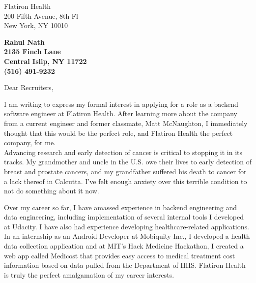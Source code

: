 \documentclass[11pt]{letter} %
\begin{document}

\begin{letter}{Flatiron Health \\
200 Fifth Avenue, 8th Fl \\
New York, NY 10010} 


\begin{center}
\large\bf Rahul Nath \\ %
2135 Finch Lane \\ Central Islip, NY 11722 \\ (516) 491-9232 %
\end{center}

\signature{Rahul Nath} %


\opening{Dear Recruiters,} 
 
I am writing to express my formal interest in applying for a role as a backend software engineer at Flatiron Health. After learning more about the company from a current engineer and former classmate, Matt McNaughton, I immediately thought that this would be the perfect role, and Flatiron Health the perfect company, for me. 
\\

Advancing research and early detection of cancer is critical to stopping it in its tracks. My grandmother and uncle in the U.S. owe their lives to early detection of breast and prostate cancers, and my grandfather suffered his death to cancer for a lack thereof in Calcutta. I've felt enough anxiety over this terrible condition to not do something about it now. 

Over my career so far, I have amassed experience in backend engineering and data engineering, including implementation of several internal tools I developed at Udacity. I have also had experience developing healthcare-related applications. In an internship as an Android Developer at Mobiquity Inc., I developed a health data collection application and at MIT's Hack Medicine Hackathon, I created a web app called Medicost that provides easy access to medical treatment cost information based on data pulled from the Department of HHS. Flatiron Health is truly the perfect amalgamation of my career interests. 
 \\


\end{letter}
\end{document}
